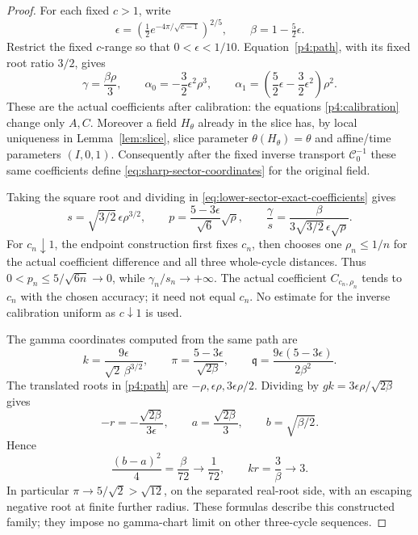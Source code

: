 \begin{proof}
For each fixed $c>1$, write
\[
 \epsilon=\left(\tfrac12e^{-4\pi/\sqrt{c-1}}\right)^{2/5},
 \qquad \beta=1-\tfrac52\epsilon.
\]
Restrict the fixed $c$-range so that $0<\epsilon<1/10$.
Equation~\eqref{p4:path}, with its fixed root ratio $3/2$, gives
\begin{equation}\label{eq:lower-sector-exact-coefficients}
 \gamma=\frac{\beta\rho}{3},\qquad
 \alpha_0=-\frac32\epsilon^2\rho^3,\qquad
 \alpha_1=\left(\frac52\epsilon-\frac32\epsilon^2\right)\rho^2.
\end{equation}
These are the actual coefficients after calibration: the equations
\eqref{p4:calibration} change only $A,C$. Moreover a field $H_\theta$
already in the slice has, by local uniqueness in Lemma~\ref{lem:slice},
slice parameter $\theta(H_\theta)=\theta$ and affine/time parameters
$(I,0,1)$. Consequently after the fixed inverse transport
$\mathscr C_0^{-1}$ these same coefficients define
\eqref{eq:sharp-sector-coordinates} for the original field.

Taking the square root and dividing in
\eqref{eq:lower-sector-exact-coefficients} gives
\begin{equation}\label{eq:lower-sector-ratios}
 s=\sqrt{3/2}\,\epsilon\rho^{3/2},\qquad
 p=\frac{5-3\epsilon}{\sqrt6}\sqrt\rho,\qquad
 \frac\gamma s=\frac{\beta}
 {3\sqrt{3/2}\,\epsilon\sqrt\rho}.
\end{equation}
For $c_n\downarrow1$, the endpoint construction first fixes $c_n$,
then chooses one $\rho_n\le1/n$ for the actual coefficient difference
and all three whole-cycle distances. Thus
$0<p_n\le5/\sqrt{6n}\to0$, while $\gamma_n/s_n\to+\infty$.
The actual coefficient $C_{c_n,\rho_n}$ tends to $c_n$ with the
chosen accuracy; it need not equal $c_n$. No estimate for the inverse
calibration uniform as $c\downarrow1$ is used.

The gamma coordinates computed from the same path are
\begin{equation}\label{eq:lower-sector-gamma-coordinates}
 k=\frac{9\epsilon}{\sqrt2\,\beta^{3/2}},\qquad
 \pi=\frac{5-3\epsilon}{\sqrt{2\beta}},\qquad
 \mathfrak q=\frac{9\epsilon(5-3\epsilon)}{2\beta^2}.
\end{equation}
The translated roots in \eqref{p4:path} are
$-\rho,\epsilon\rho,3\epsilon\rho/2$. Dividing by
$gk=3\epsilon\rho/\sqrt{2\beta}$ gives
\[
 -r=-\frac{\sqrt{2\beta}}{3\epsilon},\qquad
 a=\frac{\sqrt{2\beta}}3,\qquad b=\sqrt{\beta/2}.
\]
Hence
\begin{equation}\label{eq:lower-sector-root-gap}
 \frac{(b-a)^2}{4}=\frac{\beta}{72}\longrightarrow\frac1{72},
 \qquad kr=\frac3\beta\longrightarrow3.
\end{equation}
In particular $\pi\to5/\sqrt2>\sqrt{12}$, on the separated real-root
side, with an escaping negative root at finite further radius.
These formulas describe this constructed family; they impose no
gamma-chart limit on other three-cycle sequences.


\end{proof}
